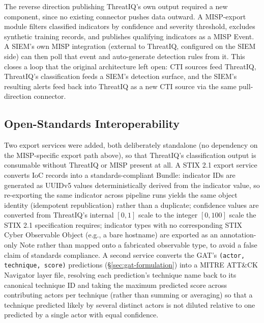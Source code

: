 \documentclass[conference]{IEEEtran}
\begin{document}
The reverse direction \textemdash{} publishing ThreatIQ's own output \textemdash{} required a new component, since no existing connector pushes data outward. A MISP-export module filters classified indicators by confidence and severity threshold, excludes synthetic training records, and publishes qualifying indicators as a MISP Event. A SIEM's own MISP integration (external to ThreatIQ, configured on the SIEM side) can then poll that event and auto-generate detection rules from it. This closes a loop that the original architecture left open: CTI sources feed ThreatIQ, ThreatIQ's classification feeds a SIEM's detection surface, and the SIEM's resulting alerts feed back into ThreatIQ as a new CTI source via the same pull-direction connector.

\subsection{Open-Standards Interoperability}
Two export services were added, both deliberately standalone (no dependency on the MISP-specific export path above), so that ThreatIQ's classification output is consumable without ThreatIQ or MISP present at all. A STIX 2.1 export service converts IoC records into a standards-compliant Bundle: indicator IDs are generated as UUIDv5 values deterministically derived from the indicator value, so re-exporting the same indicator across pipeline runs yields the same object identity (idempotent republication) rather than a duplicate; confidence values are converted from ThreatIQ's internal $[0,1]$ scale to the integer $[0,100]$ scale the STIX 2.1 specification requires; indicator types with no corresponding STIX Cyber Observable Object (e.g., a bare hostname) are exported as an annotation-only Note rather than mapped onto a fabricated observable type, to avoid a false claim of standards compliance. A second service converts the GAT's \texttt{(actor, technique, score)} predictions (\S\ref{sec:gat-formulation}) into a MITRE ATT\&CK Navigator layer file, resolving each prediction's technique name back to its canonical technique ID and taking the maximum predicted score across contributing actors per technique (rather than summing or averaging) so that a technique predicted likely by several distinct actors is not diluted relative to one predicted by a single actor with equal confidence.
\end{document}
